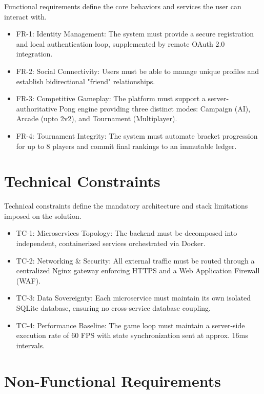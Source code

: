 \documentclass[11pt,a4paper]{report}
\begin{document}
Functional requirements define the core behaviors and services the user can interact with.
\begin{itemize}
  \item FR-1: Identity Management: The system must provide a secure registration and local authentication loop, supplemented by remote OAuth 2.0 integration.
  \item FR-2: Social Connectivity: Users must be able to manage unique profiles and establish bidirectional "friend" relationships.
  \item FR-3: Competitive Gameplay: The platform must support a server-authoritative Pong engine providing three distinct modes: Campaign (AI), Arcade (upto 2v2), and Tournament (Multiplayer).
  \item FR-4: Tournament Integrity: The system must automate bracket progression for up to 8 players and commit final rankings to an immutable ledger.
\end{itemize}

\section{Technical Constraints}
\label{sec:tech_req}

Technical constraints define the mandatory architecture and stack limitations imposed on the solution.
\begin{itemize}
  \item TC-1: Microservices Topology: The backend must be decomposed into independent, containerized services orchestrated via Docker.
  \item TC-2: Networking \& Security: All external traffic must be routed through a centralized Nginx gateway enforcing HTTPS and a Web Application Firewall (WAF).
  \item TC-3: Data Sovereignty: Each microservice must maintain its own isolated SQLite database, ensuring no cross-service database coupling.
  \item TC-4: Performance Baseline: The game loop must maintain a server-side execution rate of 60 FPS with state synchronization sent at approx. 16ms intervals.
\end{itemize}

\section{Non-Functional Requirements}
\label{sec:non_func_req}
\end{document}
